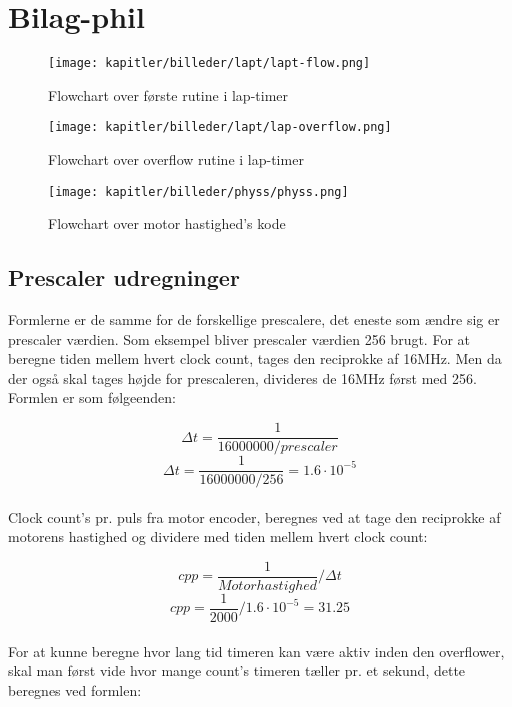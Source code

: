 \newpage

\section{Bilag-phil}

\begin{figure}[h]
\centering
\texttt{[image: kapitler/billeder/lapt/lapt-flow.png]}
\caption{Flowchart over første rutine i lap-timer}
\label{fig:lapt-flow}
\end{figure}

\newpage
\begin{figure}[h]
\centering
\texttt{[image: kapitler/billeder/lapt/lap-overflow.png]}
\caption{Flowchart over overflow rutine i lap-timer}
\label{fig:lap-overflow}
\end{figure}

\newpage
\begin{figure}[h]
\centering
\texttt{[image: kapitler/billeder/physs/physs.png]}
\caption{Flowchart over motor hastighed's kode}
\label{fig:physs}
\end{figure}


\newpage
\subsection{Prescaler udregninger}
\label{subsec:prescaler_udregninger}
Formlerne er de samme for de forskellige prescalere, det eneste som ændre sig er prescaler værdien. Som eksempel bliver prescaler værdien 256 brugt. For at beregne tiden mellem hvert clock count, tages den reciprokke af 16MHz. Men da der også skal tages højde for prescaleren, divideres de 16MHz først med 256. Formlen er som følgeenden:

$$\Delta t = \frac{1}{16000000/prescaler}$$
$$\Delta t = \frac{1}{16000000/256} = 1.6 \cdot 10^{-5}$$\\

Clock count's pr. puls fra motor encoder, beregnes ved at tage den reciprokke af motorens hastighed og dividere med tiden mellem hvert clock count:

$$cpp = \frac{1}{Motor hastighed} / \Delta t$$
$$cpp = \frac{1}{2000} / 1.6 \cdot 10^{-5} = 31.25$$\\

For at kunne beregne hvor lang tid timeren kan være aktiv inden den overflower, skal man først vide hvor mange count's timeren tæller pr. et sekund, dette  beregnes ved formlen:


